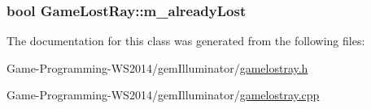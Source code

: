\subsubsection[{m\+\_\+already\+Lost}]{\setlength{\rightskip}{0pt plus 5cm}bool Game\+Lost\+Ray\+::m\+\_\+already\+Lost\hspace{0.3cm}{\ttfamily [protected]}}\label{class_game_lost_ray_a9b8fd54b22a3f25d4fef9431cebafa7a}


The documentation for this class was generated from the following files\+:\begin{DoxyCompactItemize}
\item 
Game-\/\+Programming-\/\+W\+S2014/gem\+Illuminator/\hyperlink{gamelostray_8h}{gamelostray.\+h}\item 
Game-\/\+Programming-\/\+W\+S2014/gem\+Illuminator/\hyperlink{gamelostray_8cpp}{gamelostray.\+cpp}\end{DoxyCompactItemize}
